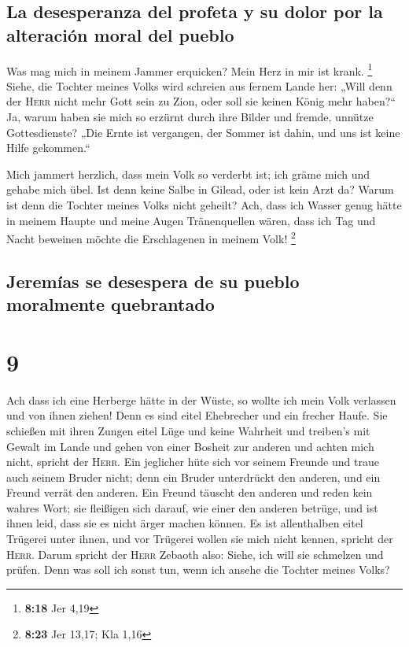 \hypertarget{la-desesperanza-del-profeta-y-su-dolor-por-la-alteraciuxf3n-moral-del-pueblo}{%
\subsection{La desesperanza del profeta y su dolor por la alteración
moral del
pueblo}\label{la-desesperanza-del-profeta-y-su-dolor-por-la-alteraciuxf3n-moral-del-pueblo}}

 Was mag mich in meinem Jammer erquicken? Mein Herz in
mir ist krank. \footnote{\textbf{8:18} Jer 4,19}  Siehe,
die Tochter meines Volks wird schreien aus fernem Lande her: „Will denn
der \textsc{Herr} nicht mehr Gott sein zu Zion, oder soll sie keinen
König mehr haben?{}`` Ja, warum haben sie mich so erzürnt durch ihre
Bilder und fremde, unnütze Gottesdienste?  „Die Ernte ist
vergangen, der Sommer ist dahin, und uns ist keine Hilfe gekommen.``

 Mich jammert herzlich, dass mein Volk so verderbt ist;
ich gräme mich und gehabe mich übel.  Ist denn keine
Salbe in Gilead, oder ist kein Arzt da? Warum ist denn die Tochter
meines Volks nicht geheilt?  Ach, dass ich Wasser genug
hätte in meinem Haupte und meine Augen Tränenquellen wären, dass ich Tag
und Nacht beweinen möchte die Erschlagenen in meinem Volk! \footnote{\textbf{8:23}
  Jer 13,17; Kla 1,16}

\hypertarget{jeremuxedas-se-desespera-de-su-pueblo-moralmente-quebrantado}{%
\subsection{Jeremías se desespera de su pueblo moralmente
quebrantado}\label{jeremuxedas-se-desespera-de-su-pueblo-moralmente-quebrantado}}

\hypertarget{section-8}{%
\section{9}\label{section-8}}

 Ach dass ich eine Herberge hätte in der Wüste, so wollte
ich mein Volk verlassen und von ihnen ziehen! Denn es sind eitel
Ehebrecher und ein frecher Haufe.  Sie schießen mit ihren
Zungen eitel Lüge und keine Wahrheit und treiben's mit Gewalt im Lande
und gehen von einer Bosheit zur anderen und achten mich nicht, spricht
der \textsc{Herr}.  Ein jeglicher hüte sich vor seinem
Freunde und traue auch seinem Bruder nicht; denn ein Bruder unterdrückt
den anderen, und ein Freund verrät den anderen.  Ein
Freund täuscht den anderen und reden kein wahres Wort; sie fleißigen
sich darauf, wie einer den anderen betrüge, und ist ihnen leid, dass sie
es nicht ärger machen können.  Es ist allenthalben eitel
Trügerei unter ihnen, und vor Trügerei wollen sie mich nicht kennen,
spricht der \textsc{Herr}.  Darum spricht der
\textsc{Herr} Zebaoth also: Siehe, ich will sie schmelzen und prüfen.
Denn was soll ich sonst tun, wenn ich ansehe die Tochter meines Volks?

